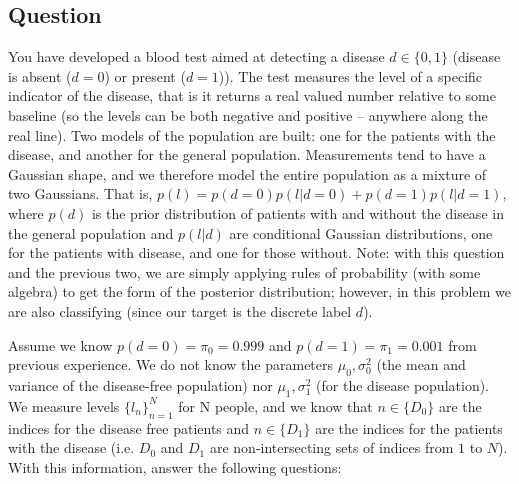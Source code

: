 \documentclass[12pt,a4paper]{article}
\begin{document}
\subsection{Question}
You have developed a blood test aimed at detecting a disease $d \in \{0,1\}$ (disease is absent ($d=0$) or present ($d=1$)).  The test measures the level of a specific indicator of the disease, that is it returns a real valued number relative to some baseline (so the levels can be both negative and positive -- anywhere along the real line).  Two models of the population are built: one for the patients with the disease, and another for the general population.  Measurements tend to have a Gaussian shape, and we therefore model the entire population as a mixture of two Gaussians.  That is, $p( l ) = p(d=0) p( l | d=0 ) + p(d=1) p( l | d=1 )$, where $p(d)$ is the prior distribution of patients with and without the disease in the general population and $p(l|d)$  are conditional Gaussian distributions, one for the patients with disease, and one for those without.  Note: with this question and the previous two, we are simply applying rules of probability (with some algebra) to get the form of the posterior distribution; however, in this problem we are also classifying (since our target is the discrete label $d$).

Assume we know $p(d=0) = \pi_0 = 0.999$ and $p(d=1) = \pi_1 = 0.001$ from previous experience.  We do not know the parameters $\mu_0, \sigma_0^2$ (the mean and variance of the disease-free population) nor $\mu_1, \sigma_1^2$ (for the disease population).  We measure levels $\{ l_n\}_{n=1}^N$ for N people, and we know that $n\in\{D_0\}$ are the indices for the disease free patients and $n\in\{D_1\}$ are the indices for the patients with the disease (i.e. $D_0$ and $D_1$ are non-intersecting sets of indices from $1$ to $N$).  With this information, answer the following questions:
\end{document}
